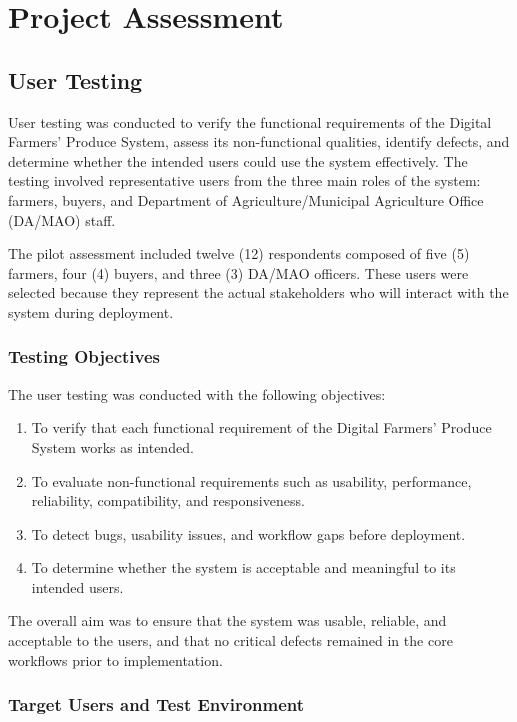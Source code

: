 
\section{Project Assessment}

\subsection{User Testing}

User testing was conducted to verify the functional requirements of the Digital Farmers' Produce System, assess its non-functional qualities, identify defects, and determine whether the intended users could use the system effectively. The testing involved representative users from the three main roles of the system: farmers, buyers, and Department of Agriculture/Municipal Agriculture Office (DA/MAO) staff.

The pilot assessment included twelve (12) respondents composed of five (5) farmers, four (4) buyers, and three (3) DA/MAO officers. These users were selected because they represent the actual stakeholders who will interact with the system during deployment.

\subsubsection{Testing Objectives}

The user testing was conducted with the following objectives:

\begin{enumerate}
    \item To verify that each functional requirement of the Digital Farmers' Produce System works as intended.
    \item To evaluate non-functional requirements such as usability, performance, reliability, compatibility, and responsiveness.
    \item To detect bugs, usability issues, and workflow gaps before deployment.
    \item To determine whether the system is acceptable and meaningful to its intended users.
\end{enumerate}

The overall aim was to ensure that the system was usable, reliable, and acceptable to the users, and that no critical defects remained in the core workflows prior to implementation.

\subsubsection{Target Users and Test Environment}

